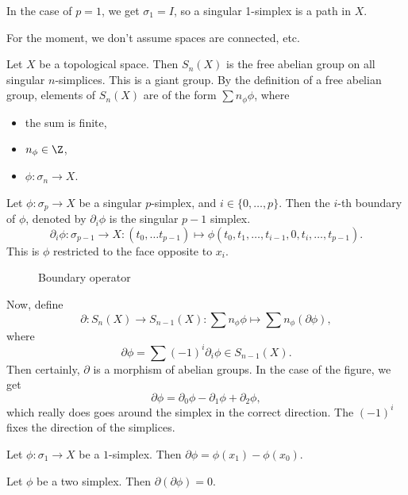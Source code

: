 In the case of $p=1$, we get $\sigma_1 = I$, so a singular 1-simplex is a path in $X$.

For the moment, we don't assume spaces are connected, etc.
\begin{definition}
    Let $X$ be a topological space.
    Then $S_n(X)$ is the free abelian group on all singular $n$-simplices.
    This is a giant group.
    By the definition of a free abelian group, elements of $S_n(X)$ are of the form $\sum n_\phi \phi$, where
     \begin{itemize}
         \item the sum is finite,
         \item $n_\phi \in \Z$,
         \item $\phi: \sigma_n \to X$.
    \end{itemize}
\end{definition}

Let $\phi: \sigma_p \to  X$ be a singular $p$-simplex, and $i \in  \{0, \ldots, p\}$.
Then the $i$-th boundary of $\phi$, denoted by $\partial_i \phi$ is the singular $p-1$ simplex.
\[
    \partial_i \phi: \sigma_{p-1} \to  X: (t_0, \ldots t_{p-1}) \mapsto \phi(t_0, t_1, \ldots, t_{i-1}, 0, t_i, \ldots, t_{p-1})
.\]
This is $\phi$ restricted to the face opposite to $x_i$.

\begin{figure}[H]
    \centering
    \caption{Boundary operator}
    \label{fig:boundary-operator}
\end{figure}

Now, define \[
    \partial: S_n(X) \to  S_{n-1}(X): \sum n_\phi \phi \mapsto \sum n_\phi (\partial \phi),
 \]
 where
 \[
     \partial \phi = \sum (-1)^{i}  \partial_i \phi \in S_{n-1}(X)
 .\] 
 Then certainly, $\partial$ is a morphism of abelian groups.
 In the case of the figure, we get
 \[
 \partial \phi = \partial_0 \phi - \partial _1 \phi + \partial _2 \phi
 ,\] 
 which really does goes around the simplex in the correct direction. The $(-1)^{i}$ fixes the direction of the simplices.

 \begin{eg}
     Let $\phi: \sigma_1 \to X$ be a $1$-simplex.
     Then $\partial \phi = \phi(x_1)  - \phi(x_0)$.
 \end{eg}

 \begin{eg}
    Let $\phi$ be a two simplex.
    Then $\partial(\partial \phi) = 0$.
 \end{eg}

